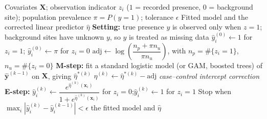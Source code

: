 \documentclass{article}
\begin{document}
\begin{algorithm}[!h]
\renewcommand{\algorithmicrequire}{\textbf{Input:}}
\renewcommand{\algorithmicensure}{\textbf{Output:}}
	\caption{Presence-only EM}
	\begin{algorithmic}[1]
	    \REQUIRE
	    Covariates $\mathbf{X}$; observation indicator $z_{i}$ ($1$ = recorded presence,
	    $0$ = background site); population prevalence $\pi=P(y=1)$;
	    tolerance $\epsilon$
	    \ENSURE
	    Fitted model and the corrected linear predictor $\hat{\eta}$
	    \STATE \textbf{Setting:} true presence $y$ is observed only when $z=1$; background sites
	    have unknown $y$, so $y$ is treated as missing data %
	    \STATE $\hat{y}_{i}^{(0)}\leftarrow 1$ for $z_{i}=1$;\quad
	    $\hat{y}_{i}^{(0)}\leftarrow \pi$ for $z_{i}=0$ %
	    \STATE $\mathrm{adj}\leftarrow \log\!\left(\dfrac{n_{p}+\pi n_{u}}{\pi n_{u}}\right)$,
	    with $n_{p}=\#\{z_{i}=1\}$, $n_{u}=\#\{z_{i}=0\}$
	    \STATE \textbf{M-step:} fit a standard logistic model (or GAM, boosted trees) of
	    $\hat{\mathbf{y}}^{(k-1)}$ on $\mathbf{X}$, giving $\hat{\eta}^{\ast(k)}$ %
	    \STATE \quad $\hat{\eta}^{(k)}\leftarrow \hat{\eta}^{\ast(k)}-\mathrm{adj}$
	    \hfill \emph{case--control intercept correction} %
	    \STATE \textbf{E-step:}
	    $\hat{y}_{i}^{(k)}\leftarrow \dfrac{e^{\hat{\eta}^{(k)}(\mathbf{x}_{i})}}{1+e^{\hat{\eta}^{(k)}(\mathbf{x}_{i})}}$
	    for $z_{i}=0$;\quad $\hat{y}_{i}^{(k)}\leftarrow 1$ for $z_{i}=1$
	    \STATE Stop when $\max_{i}\left|\hat{y}_{i}^{(k)}-\hat{y}_{i}^{(k-1)}\right|<\epsilon$
	    \ENDFOR
		\RETURN the fitted model and $\hat{\eta}$
	\end{algorithmic}
\end{algorithm}
\end{document}
